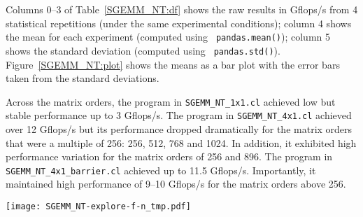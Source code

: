 \documentclass{acm_proc_article-sp} %
\begin{document}
Columns 0--3 of Table~\ref{SGEMM_NT:df} shows the raw results in
Gflops/s from 4 statistical repetitions (under the same experimental
conditions); column 4 shows the mean for each experiment (computed using {\tt
pandas.mean()}); column 5 shows the standard deviation (computed using {\tt
pandas.std()}).
%
Figure~\ref{SGEMM_NT:plot} shows the means as a bar plot with the error bars
taken from the standard deviations.

Across the matrix orders, the program in \verb|SGEMM_NT_1x1.cl| achieved
low but stable performance up to 3 Gflops/s.
%
The program in \verb|SGEMM_NT_4x1.cl| achieved over 12 Gflops/s but its
performance dropped dramatically for the matrix orders that were a multiple of
256: 256, 512, 768 and 1024.
%
In addition, it exhibited high performance variation for the matrix orders of
256 and 896.
%
The program in \verb|SGEMM_NT_4x1_barrier.cl| achieved up to 11.5
Gflops/s. Importantly, it maintained high performance of 9--10 Gflops/s
for the matrix orders above 256.


\begin{table*}
  \centering
  \caption{\label{SGEMM_NT:df}The performance of 3 SGEMM NT kernels: {\tt pandas} DataFrame with raw results.}
  
\end{table*}

\begin{figure*}
  \texttt{[image: SGEMM\_NT-explore-f-n\_tmp.pdf]}
  \caption{The performance of 3 SGEMM NT kernels: {\tt matplotlib} bar plot with error bars.}
  \label{SGEMM_NT:plot}
\end{figure*}


%

\end{document}
